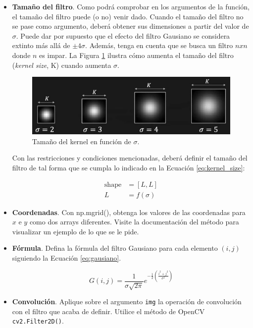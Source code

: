 \begin{itemize}
    \item \textbf{Tamaño del filtro}. Como podrá comprobar en los argumentos de la función, el tamaño del filtro puede (o no) venir dado. Cuando el tamaño del filtro no se pase como argumento, deberá obtener sus dimensiones a partir del valor de $\sigma$. Puede dar por supuesto que el efecto del filtro Gausiano se considera extinto más allá de $\pm4\sigma$. Además, tenga en cuenta que se busca un filtro $n x n$ donde $n$ es impar. La Figura \ref{fig:kernel_size} ilustra cómo aumenta el tamaño del filtro (\textit{kernel size}, K) cuando aumenta $\sigma$.

    \begin{figure}[h]
    \centering
    \includegraphics[width=0.6 \textwidth]{Lab_2/template/figures/kernel_size.png}
    \caption{Tamaño del kernel en función de $\sigma$.}
    \label{fig:kernel_size}
    \end{figure}

    Con las restricciones y condiciones mencionadas, deberá definir el tamaño del filtro de tal forma que se cumpla lo indicado en la Ecuación \ref{eq:kernel_size}:

    \begin{align}
     \text{shape} &= [L, L]\\
     L &= f(\sigma)
    \label{eq:kernel_size}
    \end{align}

    
    \item  \textbf{Coordenadas}. Con np.mgrid(), obtenga los valores de las coordenadas para $x$ e $y$ como dos arrays diferentes. Visite la documentación del método para visualizar un ejemplo de lo que se le pide.
    \item  \textbf{Fórmula}. Defina la fórmula del filtro Gausiano para cada elemento $(i, j)$ siguiendo la Ecuación \ref{eq:gausiano}.

    \begin{equation}
    G(i,j) = \frac{1}{\sigma \sqrt{2\pi}} e^{-\frac{1}{2} \left( \frac{i^2 + j^2}{\sigma^2} \right)}
    \label{eq:gausiano}
    \end{equation}

    \item  \textbf{Convolución}. Aplique sobre el argumento \texttt{img} la operación de convolución con el filtro que acaba de definir. Utilice el método de OpenCV \texttt{cv2.Filter2D()}.
\end{itemize}

